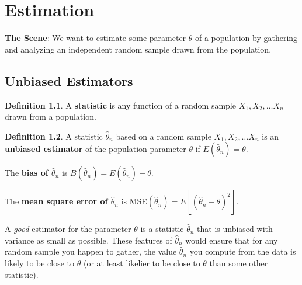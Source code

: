 \documentclass[
]{book}
\theoremstyle{definition}
\newtheorem{definition}{Definition}[chapter]
\theoremstyle{definition}
\theoremstyle{definition}
\theoremstyle{definition}
\theoremstyle{remark}
\begin{document}
\chapter{Estimation}\label{estimation}

\textbf{The Scene}: We want to estimate some parameter \(\theta\) of a population by gathering and analyzing an independent random sample drawn from the population.

\section{Unbiased Estimators}\label{unbiased-estimators}

\begin{definition}
\protect\hypertarget{def:statistic}{}\label{def:statistic}A \textbf{statistic} is any function of a random sample \(X_1, X_2, \ldots X_n\) drawn from a population.
\end{definition}

\begin{definition}
A statistic \(\hat{\theta}_n\) based on a random sample \(X_1, X_2, \ldots X_n\) is an \textbf{unbiased estimator} of the population parameter \(\theta\) if \(E(\hat{\theta}_n) = \theta\).

The \textbf{bias of \(\hat{\theta}_n\)} is \(B(\hat{\theta}_n) = E(\hat{\theta}_n)-\theta\).

The \textbf{mean square error of \(\hat{\theta}_n\)} is MSE\((\hat{\theta}_n) = E[(\hat{\theta}_n-\theta)^2]\).
\end{definition}

A \emph{good} estimator for the parameter \(\theta\) is a statistic \(\hat{\theta}_n\) that is unbiased with variance as small as possible. These features of \(\hat{\theta}_n\) would ensure that for any random sample you happen to gather, the value \(\hat{\theta}_n\) you compute from the data is likely to be close to \(\theta\) (or at least likelier to be close to \(\theta\) than some other statistic).
\end{document}
